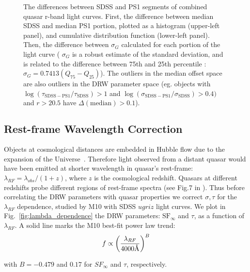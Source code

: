 \documentclass[twocolumn]{aastex62}
\let\oldAA\AA
\renewcommand{\AA}{\text{\normalfont\oldAA}}
\begin{document}
\begin{figure} %
\caption{The differences between SDSS and PS1 segments of combined quasar r-band light curves. First, the difference between median SDSS and median PS1 portion, plotted as a histogram (upper-left panel), and cumulative distribution function (lower-left panel). Then, the difference between $\sigma_{G}$ calculated for each portion of the light curve (
$\sigma_{G}$ is a robust estimate of the standard deviation, and is related to the difference between 75th and 25th percentile : $\sigma_{G} = 0.7413(Q_{75} - Q_{25})$). The outliers in the median offset space are also outliers in the DRW parameter space (eg. objects with $\log{(\tau_{\mathrm{SDSS-PS1}} /  \tau_{\mathrm{SDSS}})} > 1$   and   $\log{(\sigma_{\mathrm{SDSS-PS1}} / \sigma_{\mathrm{SDSS}})}   > 0.4  )$  and $r > 20.5$  have    $\Delta(\mathrm{median}) > 0.1$).}
\label{fig:median_offsets}
\end{figure}




\subsection{Rest-frame Wavelength Correction}

Objects at cosmological distances are embedded in Hubble flow due to the expansion of the Universe~\citep{riess2019}. Therefore light observed from a distant quasar would have been emitted at shorter wavelength in quasar's rest-frame: $\lambda_{RF} = \lambda_{obs} / (1+z)$, where $z$ is the cosmological redshift. Quasars at different redshifts probe different regions of rest-frame spectra (see Fig.7 in \citealt{shen2018}). Thus before correlating the DRW parameters with quasar properties we correct $\sigma, \tau$ for the $\lambda_{RF}$ dependence, studied by M10 with SDSS $ugriz$ light curves. We plot in Fig.~\ref{fig:lambda_dependence} the DRW parameters: $\mathrm{SF}_{\infty}$ and $\tau$, as a function of $\lambda_{RF}$. A solid line marks the M10 best-fit power law trend:
\begin{equation}
\label{eq:lambda}
f \propto \left( \frac{\lambda_{RF}}{4000 \mbox{\AA}} \right)^{B}
\end{equation}

with  $B=-0.479$ and $0.17$ for $SF_{\infty}$ and $\tau$, respectively.
\end{document}
